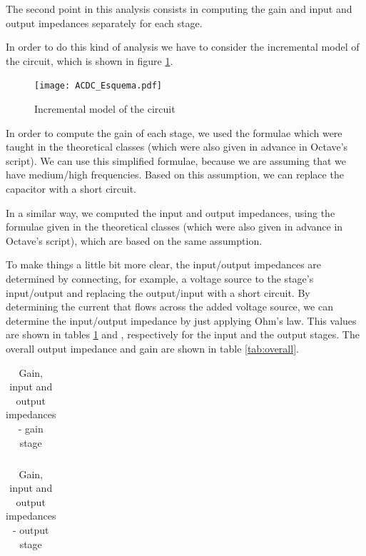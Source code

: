 \par The second point in this analysis consists in computing the gain and input and output impedances separately for each stage.
\par In order to do this kind of analysis we have to consider the incremental model of the circuit, which is shown in figure \ref{fig:3}.

\begin{figure}[H] \centering
	\texttt{[image: ACDC\_Esquema.pdf]}
	\caption{Incremental model of the circuit}
	\label{fig:3}
\end{figure}

\par In order to compute the gain of each stage, we used the formulae which were taught in the theoretical classes (which were also given in advance in Octave's script). We can use this simplified formulae, because we are assuming that we have medium/high frequencies. Based on this assumption, we can replace the capacitor with a short circuit.
\par In a similar way, we computed the input and output impedances, using the formulae given in the theoretical classes (which were also given in advance in Octave's script), which are based on the same assumption.
\par To make things a little bit more clear, the input/output impedances are determined by connecting, for example, a voltage source to the stage's input/output and replacing the output/input with a short circuit. By determining the current that flows across the added voltage source, we can determine the input/output impedance by just applying Ohm's law. This values are shown in tables \ref{tab:stage1} and \label{tab:stage2}, respectively for the input and the output stages. The overall output impedance and gain are shown in table \ref{tab:overall}.

\vspace{5mm}
\begin{table}[H]
	\centering
	\begin{tabularx}{0.9\textwidth} {
 	    | >{\raggedright\arraybackslash}X
  	    | >{\raggedleft\arraybackslash}X | }
	\hline
	
	\end{tabularx}
	\caption{Gain, input and output impedances - gain stage}
	\label{tab:stage1}
\end{table}
\vspace{5mm}

\begin{table}[H]
	\centering
	\begin{tabularx}{0.9\textwidth} {
 	    | >{\raggedright\arraybackslash}X
  	    | >{\raggedleft\arraybackslash}X | }
	\hline
	
	\end{tabularx}
	\caption{Gain, input and output impedances - output stage}
	\label{tab:stage2}
\end{table}
\vspace{5mm}

